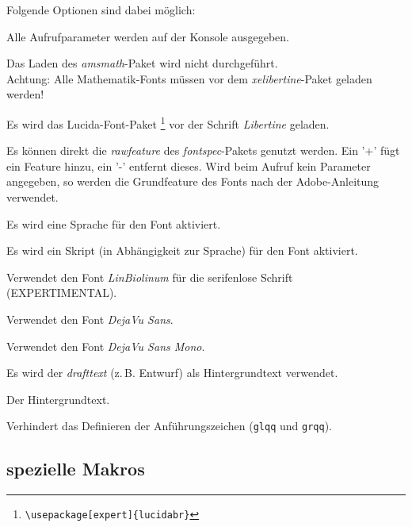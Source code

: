 \documentclass{fontdoku}
\begin{document}
Folgende Optionen sind dabei möglich:
\begin{description}
\item [debug] Alle Aufrufparameter werden auf der Konsole ausgegeben.
\item [noamsmath] Das Laden des \emph{amsmath}-Paket wird nicht durchgeführt.\\
      Achtung: Alle Mathematik-Fonts müssen vor dem \emph{xelibertine}-Paket
      geladen werden!
\item [lucida] Es wird das Lucida-Font-Paket%
      \footnote{\texttt{\textbackslash usepackage[expert]\{lucidabr\}}}
      vor der Schrift \emph{Libertine} geladen.
\item [rawfeature] Es können direkt die \emph{rawfeature} des \emph{fontspec}-Pakets genutzt werden.
      Ein '+' fügt ein Feature hinzu, ein '-' entfernt dieses. Wird beim Aufruf kein Parameter angegeben, so werden die Grundfeature des Fonts nach der Adobe-Anleitung verwendet.
\item [language] Es wird eine Sprache für den Font aktiviert.
\item [script]   Es wird ein Skript (in Abhängigkeit zur Sprache) für den Font aktiviert.
\item [biolinum] Verwendet den Font \emph{LinBiolinum} für die serifenlose Schrift
                 (EXPERTIMENTAL).
\item [dejavusans] Verwendet den Font \emph{DejaVu Sans}.
\item [dejavusansmono] Verwendet den Font \emph{DejaVu Sans Mono}.
\item [draft] Es wird der \emph{drafttext} (z.\,B. Entwurf) als Hintergrundtext verwendet.
\item [drafttext] Der Hintergrundtext.
\item [noquotes] Verhindert das Definieren der Anführungszeichen (\texttt{glqq} und \texttt{grqq}).
\end{description}

\newpage
\subsection{spezielle Makros}
\end{document}
